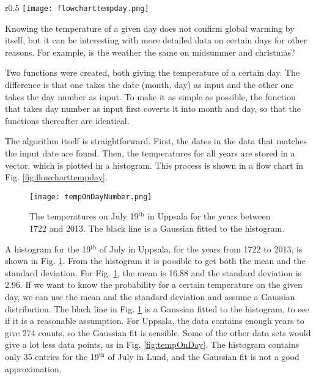 

\begin{wrapfigure}{r}{0.5\textwidth}
\texttt{[image: flowcharttempday.png]}
\caption{\label{fig:flowcharttempday} Flow chart for the function that gives the temperature of a given day.}
\end{wrapfigure}

Knowing the temperature of a given day does not confirm global warming by itself, but it can be interesting with more detailed data on certain days for other reasons. For example, is the weather the same on midsummer and christmas? 

Two functions were created, both giving the temperature of a certain day. The difference is that one takes the date (month, day) as input and the other one takes the day number as input. To make it as simple as possible, the function that takes day number as input first coverts it into month and day, so that the functions thereafter are identical. 

The algorithm itself is straightforward. First, the dates in the data that matches the input date are found. Then, the temperatures for all years are stored in a vector, which is plotted in a histogram. This process is shown in a flow chart in Fig. \ref{fig:flowcharttempday}. 

\begin{figure}[ht]
\begin{center}
\texttt{[image: tempOnDayNumber.png]}
\caption{\label{fig:tempOnDayNumber} The temperatures on July 19$^{\text{th}}$ in Uppsala for the years between 1722 and 2013. The black line is a Gaussian fitted to the histogram.}
\end{center}
\end{figure}

A histogram for the 19$^{\text{th}}$ of July in Uppsala, for the years from 1722 to 2013, is shown in Fig. \ref{fig:tempOnDayNumber}. From the histogram it is possible to get both the mean and the standard deviation. For Fig. \ref{fig:tempOnDayNumber}, the mean is 16.88 and the standard deviation is 2.96. If we want to know the probability for a certain temperature on the given day, we can use the mean and the standard deviation and assume a Gaussian distribution. The black line in Fig. \ref{fig:tempOnDayNumber} is a Gaussian fitted to the histogram, to see if it is a reasonable assumption. For Uppsala, the data contains enough years to give 274 counts, so the Gaussian fit is sensible. Some of the other data sets would give a lot less data points, as in Fig. \ref{fig:tempOnDay}. The histogram contains only 35 entries for the 19$^{\text{th}}$ of July in Lund, and the Gaussian fit is not a good approximation. 

